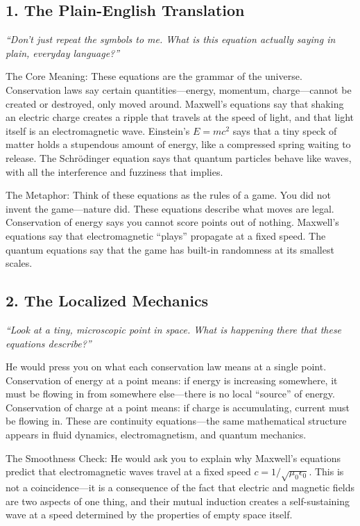 \subsection*{1. The Plain-English Translation}
\textit{``Don't just repeat the symbols to me. What is this equation actually saying in plain, everyday language?''}

The Core Meaning: These equations are the grammar of the universe. Conservation laws say certain quantities---energy, momentum, charge---cannot be created or destroyed, only moved around. Maxwell's equations say that shaking an electric charge creates a ripple that travels at the speed of light, and that light itself is an electromagnetic wave. Einstein's $E = mc^2$ says that a tiny speck of matter holds a stupendous amount of energy, like a compressed spring waiting to release. The Schr\"odinger equation says that quantum particles behave like waves, with all the interference and fuzziness that implies.

The Metaphor: Think of these equations as the rules of a game. You did not invent the game---nature did. These equations describe what moves are legal. Conservation of energy says you cannot score points out of nothing. Maxwell's equations say that electromagnetic ``plays'' propagate at a fixed speed. The quantum equations say that the game has built-in randomness at its smallest scales.

\subsection*{2. The Localized Mechanics}
\textit{``Look at a tiny, microscopic point in space. What is happening there that these equations describe?''}

He would press you on what each conservation law means at a single point. Conservation of energy at a point means: if energy is increasing somewhere, it must be flowing in from somewhere else---there is no local ``source'' of energy. Conservation of charge at a point means: if charge is accumulating, current must be flowing in. These are continuity equations---the same mathematical structure appears in fluid dynamics, electromagnetism, and quantum mechanics.

The Smoothness Check: He would ask you to explain why Maxwell's equations predict that electromagnetic waves travel at a fixed speed $c = 1/\sqrt{\mu_0 \epsilon_0}$. This is not a coincidence---it is a consequence of the fact that electric and magnetic fields are two aspects of one thing, and their mutual induction creates a self-sustaining wave at a speed determined by the properties of empty space itself.

